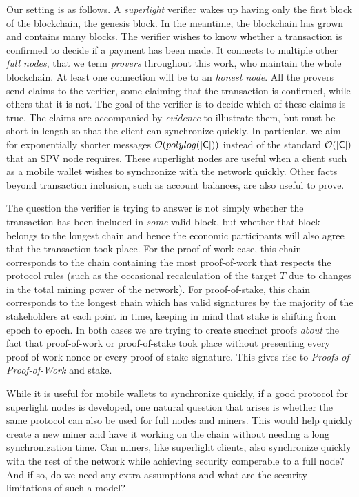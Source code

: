 Our setting is as follows. A \emph{superlight} verifier wakes up having only the
first block of the blockchain, the genesis block. In the meantime, the
blockchain has grown and contains many blocks. The verifier wishes to know
whether a transaction is confirmed to decide if a payment has been made. It
connects to multiple other \emph{full nodes}, that we term \emph{provers}
throughout this work, who maintain the whole blockchain. At least one connection
will be to an \emph{honest node}. All the provers send claims to the
verifier, some claiming that the transaction is confirmed, while others that it
is not. The goal of the verifier is to decide which of these claims is true. The
claims are accompanied by \emph{evidence} to illustrate them, but must be short
in length so that the client can synchronize quickly. In particular, we aim for
exponentially shorter messages $\mathcal{O}(polylog(|\mathsf{C}|))$ instead of the
standard $\mathcal{O}(|\mathsf{C}|)$ that an SPV node requires. These superlight nodes are
useful when a client such as a mobile wallet wishes to synchronize with the
network quickly. Other facts beyond transaction inclusion, such as account
balances, are also useful to prove.

The question the verifier is trying to answer is not simply whether the
transaction has been included in \emph{some} valid block, but whether that block
belongs to the longest chain and hence the economic participants will also agree
that the transaction took place. For the proof-of-work case, this chain
corresponds to the chain containing the most proof-of-work that respects the
protocol rules (such as the occasional recalculation of the target $T$ due to
changes in the total mining power of the network). For proof-of-stake, this
chain corresponds to the longest chain which has valid signatures by the
majority of the stakeholders at each point in time, keeping in mind that stake
is shifting from epoch to epoch. In both cases we are trying to create succinct
proofs \emph{about} the fact that proof-of-work or proof-of-stake took place
without presenting every proof-of-work nonce or every proof-of-stake signature.
This gives rise to \emph{Proofs of Proof-of-Work} and stake.

While it is useful for mobile wallets to synchronize quickly, if a good protocol
for superlight nodes is developed, one natural question that arises is whether
the same protocol can also be used for full nodes and miners. This would help
quickly create a new miner and have it working on the chain without needing a
long synchronization time. Can miners, like superlight clients, also synchronize
quickly with the rest of the network while achieving security comperable to a
full node? And if so, do we need any extra assumptions and what are the security
limitations of such a model?


